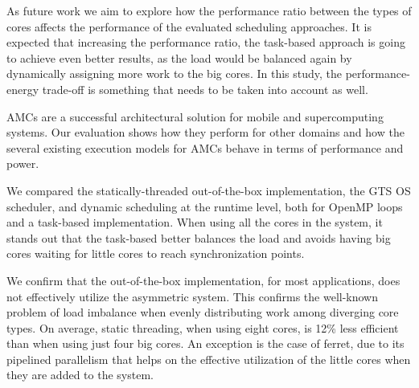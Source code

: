 As future work we aim to explore how the performance ratio between the types of cores affects the performance of the evaluated scheduling approaches. 
It is expected that increasing the performance ratio, the task-based approach is going to achieve even better results, as the load would be balanced again by dynamically assigning more work to the big cores.
In this study, the performance-energy trade-off is something that needs to be taken into account as well.




\iffalse 
AMCs are a successful architectural solution for mobile and supercomputing systems. 
Our evaluation shows how they perform for other domains and how the several existing execution models for AMCs behave in terms of performance and power. 

We compared the statically-threaded out-of-the-box implementation, the GTS OS scheduler, and dynamic scheduling at the runtime level, both for OpenMP loops and a task-based implementation. 
When using all the cores in the system, it stands out that the task-based better balances the load and avoids having big cores waiting for little cores to reach synchronization points.

We confirm that the out-of-the-box implementation, for most applications, does not effectively utilize the asymmetric system.
This confirms the well-known problem of load imbalance when evenly distributing work among diverging core types. 
On average, static threading, when using eight cores, is 12\% less efficient than when using just four big cores.
An exception is the case of ferret, due to its pipelined parallelism that helps on the effective utilization of the little cores when they are added to the system.

